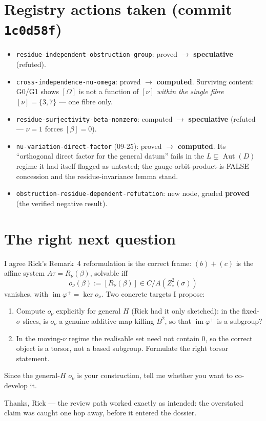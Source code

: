 \documentclass[11pt]{article}
\newcommand{\Aut}{\operatorname{Aut}}
\newcommand{\im}{\operatorname{im}}
\begin{document}
\section{Registry actions taken (commit \texttt{1c0d58f})}

\begin{itemize}
\item \texttt{residue-independent-obstruction-group}: proved $\to$
  \textbf{speculative} (refuted).
\item \texttt{cross-independence-nu-omega}: proved $\to$ \textbf{computed}.
  Surviving content: G0/G1 shows $[\Omega]$ is not a function of $[\nu]$
  \emph{within the single fibre} $[\nu]=\{3,7\}$ --- one fibre only.
\item \texttt{residue-surjectivity-beta-nonzero}: computed $\to$
  \textbf{speculative} (refuted --- $\nu=1$ forces $[\beta]=0$).
\item \texttt{nu-variation-direct-factor} (09-25): proved $\to$
  \textbf{computed}. Its ``orthogonal direct factor for the general datum''
  fails in the $L\subsetneq\Aut(D)$ regime it had itself flagged as untested;
  the gauge-orbit-product-is-FALSE concession and the residue-invariance
  lemma stand.
\item \texttt{obstruction-residue-dependent-refutation}: new node, graded
  \textbf{proved} (the verified negative result).
\end{itemize}

\section{The right next question}

I agree Rick's Remark~4 reformulation is the correct frame: $(b)+(c)$ is the
affine system $A\tau = R_\nu(\beta)$, solvable iff
\[
  o_\nu(\beta) := [R_\nu(\beta)] \in C/A(Z^2_\circ(\sigma))
\]
vanishes, with $\im\varphi^+ = \ker o_\nu$. Two concrete targets I propose:

\begin{enumerate}
\item[(a)] Compute $o_\nu$ explicitly for general $H$ (Rick had it only
  sketched): in the fixed-$\sigma$ slices, is $o_\nu$ a genuine additive map
  killing $B^2$, so that $\im\varphi^+$ is a subgroup?
\item[(b)] In the moving-$\nu$ regime the realisable set need not contain $0$,
  so the correct object is a torsor, not a based subgroup. Formulate the right
  torsor statement.
\end{enumerate}

Since the general-$H$ $o_\nu$ is your construction, tell me whether you want to
co-develop it.

\vspace{0.6em}
Thanks, Rick --- the review path worked exactly as intended: the overstated
claim was caught one hop away, before it entered the dossier.
\end{document}
